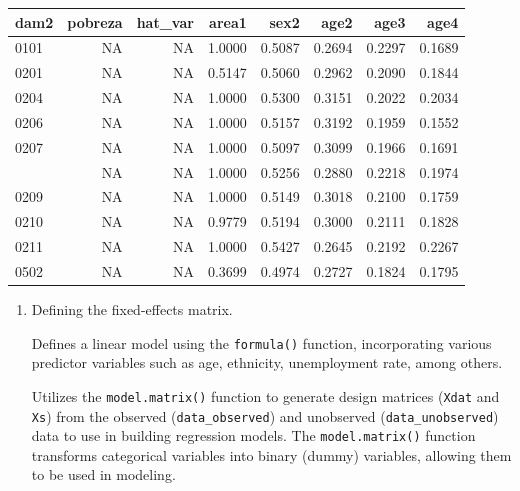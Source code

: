 \documentclass[
  12pt,
]{book}
\begin{document}
\begin{table}[H]
\centering
\centering
\begin{tabular}[t]{lrrrrrrr}
\toprule
dam2 & pobreza & hat\_var & area1 & sex2 & age2 & age3 & age4\\
\midrule
0101 & NA & NA & 1.0000 & 0.5087 & 0.2694 & 0.2297 & 0.1689\\
0201 & NA & NA & 0.5147 & 0.5060 & 0.2962 & 0.2090 & 0.1844\\
0204 & NA & NA & 1.0000 & 0.5300 & 0.3151 & 0.2022 & 0.2034\\
0206 & NA & NA & 1.0000 & 0.5157 & 0.3192 & 0.1959 & 0.1552\\
0207 & NA & NA & 1.0000 & 0.5097 & 0.3099 & 0.1966 & 0.1691\\
\addlinespace
0208 & NA & NA & 1.0000 & 0.5256 & 0.2880 & 0.2218 & 0.1974\\
0209 & NA & NA & 1.0000 & 0.5149 & 0.3018 & 0.2100 & 0.1759\\
0210 & NA & NA & 0.9779 & 0.5194 & 0.3000 & 0.2111 & 0.1828\\
0211 & NA & NA & 1.0000 & 0.5427 & 0.2645 & 0.2192 & 0.2267\\
0502 & NA & NA & 0.3699 & 0.4974 & 0.2727 & 0.1824 & 0.1795\\
\bottomrule
\end{tabular}
\end{table}

\begin{enumerate}
\def\labelenumi{\arabic{enumi}.}
\setcounter{enumi}{1}
\item
  Defining the fixed-effects matrix.

  Defines a linear model using the \texttt{formula()} function, incorporating various predictor variables such as age, ethnicity, unemployment rate, among others.

  Utilizes the \texttt{model.matrix()} function to generate design matrices (\texttt{Xdat} and \texttt{Xs}) from the observed (\texttt{data\_observed}) and unobserved (\texttt{data\_unobserved}) data to use in building regression models. The \texttt{model.matrix()} function transforms categorical variables into binary (dummy) variables, allowing them to be used in modeling.
\end{enumerate}
\end{document}

